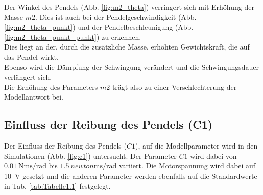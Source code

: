 Der Winkel des Pendels (Abb. \ref{fig:m2_theta}) verringert sich mit Erhöhung der Masse $m2$. 
Dies ist auch bei der Pendelgeschwindigkeit (Abb. \ref{fig:m2_theta_punkt}) und der Pendelbeschleunigung (Abb. \ref{fig:m2_theta_punkt_punkt}) zu erkennen.\\
Dies liegt an der, durch die zusätzliche Masse, erhöhten Gewichtskraft, die auf das Pendel wirkt.\\
Ebenso wird die Dämpfung der Schwingung verändert und die Schwingungsdauer verlängert sich.\\

Die Erhöhung des Parameters $m2$ trägt also zu einer Verschlechterung der Modellantwort bei.

\subsection*{Einfluss der Reibung des Pendels (C1)}
Der Einfluss der Reibung des Pendels ($C1$), auf die Modellparameter wird in den Simulationen (Abb. \ref{fig:c1}) untersucht. 
Der Parameter $C1$ wird dabei von $\SI{0.01}{\newton\meter\second\per\radian}$ bis $\SI{1.5}{newton\meter\second\per\radian}$ variiert.
Die Motorspannung wird dabei auf \SI{10}{\volt} gesetzt und die anderen Parameter werden ebenfalls auf die Standardwerte in Tab. \ref{tab:Tabelle1.1} festgelegt.\\

